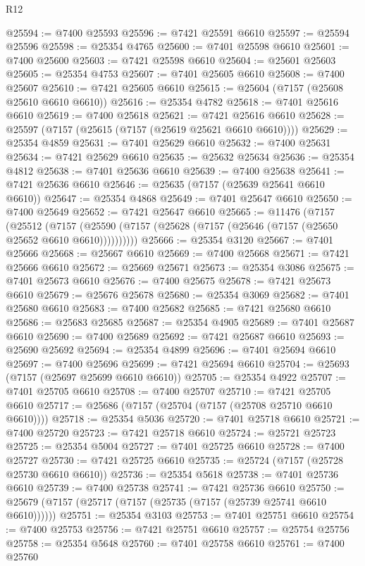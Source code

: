\begin{lexlean}{R12}
\begin{coremodule}
{{{{{{{{{{{{{{{{{{{{{{{{{{{{{{{{{{{{{{{{{{{{{{{{{{{{{{{{{{{{{{{{{{{{{{{{{{{{{{{{{{@25594 := @7400 @25593
@25596 := @7421 @25591 @6610
@25597 := @25594 @25596
@25598 := @25354 @4765
@25600 := @7401 @25598 @6610
@25601 := @7400 @25600
@25603 := @7421 @25598 @6610
@25604 := @25601 @25603
@25605 := @25354 @4753
@25607 := @7401 @25605 @6610
@25608 := @7400 @25607
@25610 := @7421 @25605 @6610
@25615 := @25604 (@7157 (@25608 @25610 @6610 @6610))
@25616 := @25354 @4782
@25618 := @7401 @25616 @6610
@25619 := @7400 @25618
@25621 := @7421 @25616 @6610
@25628 := @25597 (@7157 (@25615 (@7157 (@25619 @25621 @6610 @6610))))
@25629 := @25354 @4859
@25631 := @7401 @25629 @6610
@25632 := @7400 @25631
@25634 := @7421 @25629 @6610
@25635 := @25632 @25634
@25636 := @25354 @4812
@25638 := @7401 @25636 @6610
@25639 := @7400 @25638
@25641 := @7421 @25636 @6610
@25646 := @25635 (@7157 (@25639 @25641 @6610 @6610))
@25647 := @25354 @4868
@25649 := @7401 @25647 @6610
@25650 := @7400 @25649
@25652 := @7421 @25647 @6610
@25665 := @11476
    (@7157
      (@25512
        (@7157 (@25590 (@7157 (@25628 (@7157 (@25646 (@7157 (@25650 @25652 @6610 @6610))))))))))
@25666 := @25354 @3120
@25667 := @7401 @25666
@25668 := @25667 @6610
@25669 := @7400 @25668
@25671 := @7421 @25666 @6610
@25672 := @25669 @25671
@25673 := @25354 @3086
@25675 := @7401 @25673 @6610
@25676 := @7400 @25675
@25678 := @7421 @25673 @6610
@25679 := @25676 @25678
@25680 := @25354 @3069
@25682 := @7401 @25680 @6610
@25683 := @7400 @25682
@25685 := @7421 @25680 @6610
@25686 := @25683 @25685
@25687 := @25354 @4905
@25689 := @7401 @25687 @6610
@25690 := @7400 @25689
@25692 := @7421 @25687 @6610
@25693 := @25690 @25692
@25694 := @25354 @4899
@25696 := @7401 @25694 @6610
@25697 := @7400 @25696
@25699 := @7421 @25694 @6610
@25704 := @25693 (@7157 (@25697 @25699 @6610 @6610))
@25705 := @25354 @4922
@25707 := @7401 @25705 @6610
@25708 := @7400 @25707
@25710 := @7421 @25705 @6610
@25717 := @25686 (@7157 (@25704 (@7157 (@25708 @25710 @6610 @6610))))
@25718 := @25354 @5036
@25720 := @7401 @25718 @6610
@25721 := @7400 @25720
@25723 := @7421 @25718 @6610
@25724 := @25721 @25723
@25725 := @25354 @5004
@25727 := @7401 @25725 @6610
@25728 := @7400 @25727
@25730 := @7421 @25725 @6610
@25735 := @25724 (@7157 (@25728 @25730 @6610 @6610))
@25736 := @25354 @5618
@25738 := @7401 @25736 @6610
@25739 := @7400 @25738
@25741 := @7421 @25736 @6610
@25750 := @25679 (@7157 (@25717 (@7157 (@25735 (@7157 (@25739 @25741 @6610 @6610))))))
@25751 := @25354 @3103
@25753 := @7401 @25751 @6610
@25754 := @7400 @25753
@25756 := @7421 @25751 @6610
@25757 := @25754 @25756
@25758 := @25354 @5648
@25760 := @7401 @25758 @6610
@25761 := @7400 @25760
}}}}}}}}}}}}}}}}}}}}}}}}}}}}}}}}}}}}}}}}}}}}}}}}}}}}}}}}}}}}}}}}}}}}}}}}}}}}}}}}}}
\end{coremodule}
\end{lexlean}
